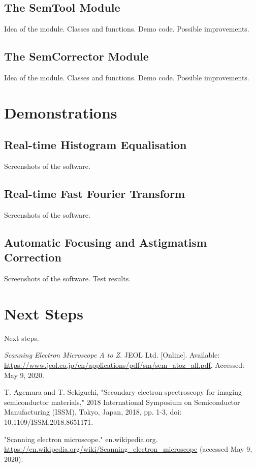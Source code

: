 \documentclass{article}
\begin{document}
\subsection{The SemTool Module}
Idea of the module.
Classes and functions.
Demo code.
Possible improvements.

\subsection{The SemCorrector Module}
Idea of the module.
Classes and functions.
Demo code.
Possible improvements.

\section{Demonstrations}
\subsection{Real-time Histogram Equalisation}
Screenshots of the software.

\subsection{Real-time Fast Fourier Transform}
Screenshots of the software.

\subsection{Automatic Focusing and Astigmatism Correction}
Screenshots of the software.
Test results.

\section{Next Steps}
Next steps.

\newpage
\begin{thebibliography}{}
    \textit{Scanning Electron Microscope A to Z}. JEOL Ltd. [Online]. Available: \url{https://www.jeol.co.jp/en/applications/pdf/sm/sem_atoz_all.pdf}. Accessed: May 9, 2020.

    T. Agemura and T. Sekiguchi, "Secondary electron spectroscopy for imaging semiconductor materials," 2018 International Symposium on Semiconductor Manufacturing (ISSM), Tokyo, Japan, 2018, pp. 1-3, doi: 10.1109/ISSM.2018.8651171.
    
    "Scanning electron microscope." en.wikipedia.org. \url{https://en.wikipedia.org/wiki/Scanning_electron_microscope} (accessed May 9, 2020).
\end{thebibliography}
\end{document}

